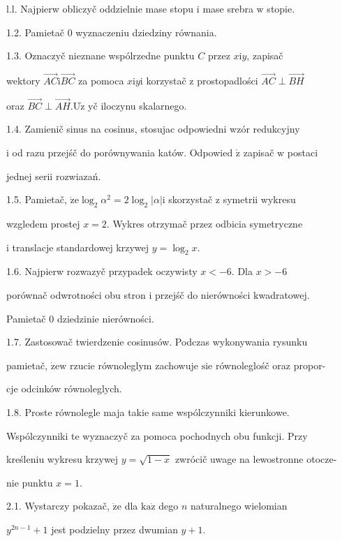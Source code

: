 \documentclass[a4paper,12pt]{article}
\begin{document}
l.l. Najpierw obliczyč oddzielnie mase stopu $\mathrm{i}$ mase srebra $\mathrm{w}$ stopie.

1.2. Pamietač $0$ wyznaczeniu dziedziny równania.

1.3. Oznaczyč nieznane wspólrzedne punktu $C$ przez $x \mathrm{i} y$, zapisač

wektory $\vec{AC}\mathrm{i}\vec{BC}$ za pomoca $x\mathrm{i}y\mathrm{i}$ korzystač $\mathrm{z}$ prostopadlości $\vec{AC}\perp\vec{BH}$

oraz $\vec{BC}\perp\vec{AH}. \mathrm{U}\dot{\mathrm{z}}$ yč iloczynu skalarnego.

1.4. Zamienič sinus na cosinus, stosujac odpowiedni wzór redukcyjny

$\mathrm{i}$ od razu przejśč do porównywania katów. Odpowied $\acute{\mathrm{z}}$ zapisač $\mathrm{w}$ postaci

jednej serii rozwiazań.

1.5. Pamietač, $\dot{\mathrm{z}}\mathrm{e} \log_{2}\alpha^{2} = 2\log_{2}|\alpha| \mathrm{i}$ skorzystač $\mathrm{z}$ symetrii wykresu

wzgledem prostej $x = 2$. Wykres otrzymač przez odbicia symetryczne

$\mathrm{i}$ translacje standardowej krzywej $y=\log_{2}x.$

1.6. Najpierw rozwazyč przypadek oczywisty $x < -6$. Dla $x > -6$

porównač odwrotności obu stron $\mathrm{i}$ przejśč do nierówności kwadratowej.

Pamietač $0$ dziedzinie nierówności.

1.7. Zastosowač twierdzenie cosinusów. Podczas wykonywania rysunku

pamietač, $\dot{\mathrm{z}}\mathrm{e}\mathrm{w}$ rzucie równoleglym zachowuje $\mathrm{s}\mathrm{i}\mathrm{e}$ równoleglośč oraz propor-

cje odcinków równoleglych.

1.8. Proste równolegle maja takie same wspólczynniki kierunkowe.

Wspólczynniki te wyznaczyč za pomoca pochodnych obu funkcji. Przy

kreśleniu wykresu krzywej $y=\sqrt{1-x}$ zwrócič uwage na lewostronne otocze-

nie punktu $x=1.$

2.1. Wystarczy pokazač, $\dot{\mathrm{z}}\mathrm{e}$ dla $\mathrm{k}\mathrm{a}\dot{\mathrm{z}}$ dego $n$ naturalnego wielomian

$y^{2n-1}+1$ jest podzielny przez dwumian $y+1.$
\end{document}
